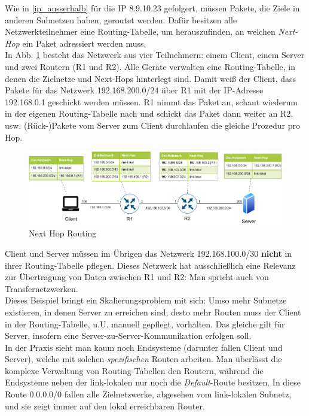 Wie in \ref{ip_ausserhalb} für die IP 8.9.10.23 gefolgert, müssen Pakete, die Ziele in anderen Subnetzen haben, geroutet werden. Dafür besitzen alle Netzwerkteilnehmer eine Routing-Tabelle, um herauszufinden, an welchen \textit{Next-Hop} ein Paket adressiert werden muss.\\
In Abb. \ref{grafik: next_hop_routing} besteht das Netzwerk aus vier Teilnehmern: einem Client, einem Server und zwei Routern (R1 und R2). Alle Geräte verwalten eine Routing-Tabelle, in denen die Zielnetze und Next-Hops hinterlegt sind.
Damit weiß der Client, dass Pakete für das Netzwerk 192.168.200.0/24 über R1 mit der IP-Adresse 192.168.0.1 geschickt werden müssen. R1 nimmt das Paket an, schaut wiederum in der eigenen Routing-Tabelle nach und schickt das Paket dann weiter an R2, usw. (Rück-)Pakete vom Server zum Client durchlaufen die gleiche Prozedur pro Hop.\\
\begin{figure}[h]
  \centering
  \includegraphics[scale=0.9]{Figures/next_hop_routing_specific_table.pdf}
  \caption{Next Hop Routing}
  \label{grafik: next_hop_routing}
\end{figure}\FloatBarrier
Client und Server müssen im Übrigen das Netzwerk 192.168.100.0/30 \textbf{nicht} in ihrer Routing-Tabelle pflegen. Dieses Netzwerk hat ausschließlich eine Relevanz zur Übertragung von Daten zwischen R1 und R2: Man spricht auch von Transfernetzwerken.\\
Dieses Beispiel bringt ein Skalierungsproblem mit sich: Umso mehr Subnetze existieren, in denen Server zu erreichen sind, desto mehr Routen muss der Client in der Routing-Tabelle, u.U. manuell gepflegt, vorhalten. Das gleiche gilt für Server, insofern eine Server-zu-Server-Kommunikation erfolgen soll.\\
In der Praxis sieht man kaum noch Endsysteme (darunter fallen Client und Server), welche mit solchen \textit{spezifischen} Routen arbeiten. Man überlässt die komplexe Verwaltung von Routing-Tabellen den Routern, während die Endsysteme neben der link-lokalen nur noch die \textit{Default}-Route besitzen. In diese Route 0.0.0.0/0 fallen alle Zielnetzwerke, abgesehen vom link-lokalen Subnetz, und sie zeigt immer auf den lokal erreichbaren Router.\\
